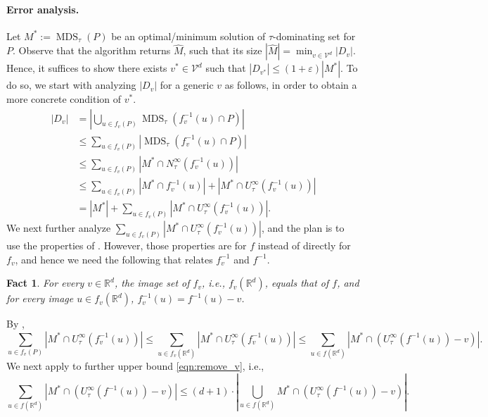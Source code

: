\documentclass[11pt,letterpaper]{article}
\theoremstyle{plain}
\newtheorem{fact}[theorem]{Fact}
\theoremstyle{definition}
\theoremstyle{remark}
\DeclareMathOperator{\MDS}{MDS}
\renewcommand{\epsilon}{\ensuremath{\varepsilon}}
\let\epsilon\varepsilon
\begin{document}
\paragraph{Error analysis.}
Let $M^* := \MDS_\tau(P)$ be an optimal/minimum solution of $\tau$-dominating set for $P$.
Observe that the algorithm returns $\widehat{M}$,
such that its size $|\widehat{M}| = \min_{v \in \mathcal{V}^d} |D_v|$.
Hence, it suffices to show there exists $v^* \in \mathcal{V}^d$ such that $|D_{v^*}| \leq (1 + \epsilon) |M^*|$.
To do so, we start with analyzing $|D_v|$ for a generic $v$ as follows,
in order to obtain a more concrete condition of $v^*$.
\begin{align}
    |D_v|
    &= \left|\bigcup_{u\in f_{v}(P)} \MDS_{\tau}(f_{v}^{-1}(u)\cap P)\right| \nonumber \\
    &\leq \sum_{u \in f_v(P)} |\MDS_\tau(f_v^{-1}(u) \cap P)| \nonumber \\
    &\leq \sum_{u \in f_v(P)} |M^* \cap N_\tau^\infty(f_v^{-1}(u))| \nonumber \\
    &\leq \sum_{u \in f_v(P)} |M^* \cap f_v^{-1}(u)| + |M^* \cap U_\tau^\infty(f_v^{-1}(u))| \nonumber \\
    &= |M^*| + \sum_{u \in f_v(P)} |M^* \cap U_\tau^\infty(f_v^{-1}(u))|. \label{eqn:DvtoMstar}
\end{align}
We next further analyze $\sum_{u \in f_v(P)} |M^* \cap U_\tau^\infty(f_v^{-1}(u))|$,
and the plan is to use the properties of .
However, those properties are for $f$ instead of directly for $f_v$, and hence we need the following  that relates $f_v^{-1}$ and $f^{-1}$.
\begin{fact}
    \label{fact:f_fv}
    For every $v \in \mathbb{R}^d$, 
    the image set of $f_v$, i.e., $f_v(\mathbb{R}^d)$, equals that of $f$,
    and for every image $u \in f_v(\mathbb{R}^d)$, $f_v^{-1}(u) = f^{-1}(u) - v$.
\end{fact}
By ,
\begin{equation}
    \label{eqn:remove_v}
    \sum_{u \in f_v(P)} |M^* \cap U_\tau^\infty(f_v^{-1}(u))|
    \leq \sum_{u \in f_v(\mathbb{R}^d)} |M^* \cap U_\tau^\infty(f_v^{-1}(u))|
    \leq \sum_{u \in f(\mathbb{R}^d)} |M^* \cap (U_\tau^\infty(f^{-1}(u)) - v)|.
\end{equation}
We next apply  to further upper bound \eqref{eqn:remove_v}, i.e.,
\begin{equation}
    \label{eqn:back_to_union}
    \sum_{u \in f(\mathbb{R}^d)} |M^* \cap (U_\tau^\infty(f^{-1}(u)) - v)|
    \leq 
    (d + 1) \cdot \left| \bigcup_{u \in f(\mathbb{R}^d)} M^* \cap (U_\tau^\infty(f^{-1}(u)) - v) \right|.
\end{equation}
\end{document}
